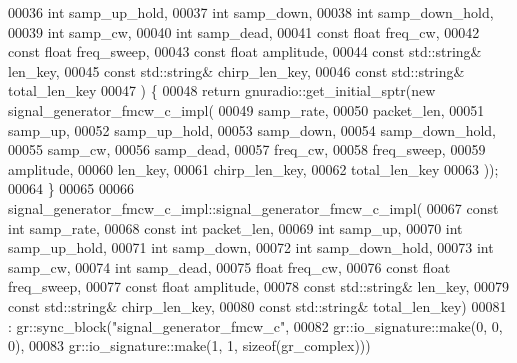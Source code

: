 \begin{DoxyCode}
00036             \textcolor{keywordtype}{int} samp\_up\_hold,
00037             \textcolor{keywordtype}{int} samp_down,
00038             \textcolor{keywordtype}{int} samp\_down\_hold,
00039             \textcolor{keywordtype}{int} samp_cw,
00040             \textcolor{keywordtype}{int} samp\_dead,
00041             \textcolor{keyword}{const} \textcolor{keywordtype}{float} freq_cw,
00042             \textcolor{keyword}{const} \textcolor{keywordtype}{float} freq\_sweep,
00043             \textcolor{keyword}{const} \textcolor{keywordtype}{float} amplitude,
00044             \textcolor{keyword}{const} std::string& len\_key,
00045             \textcolor{keyword}{const} std::string& chirp\_len\_key,
00046             \textcolor{keyword}{const} std::string& total\_len\_key
00047     ) \{
00048       \textcolor{keywordflow}{return} gnuradio::get\_initial\_sptr(\textcolor{keyword}{new} signal_generator_fmcw_c_impl(
00049           samp\_rate,
00050           packet\_len,
00051           samp\_up,
00052           samp\_up\_hold,
00053           samp\_down,
00054           samp\_down\_hold,
00055           samp\_cw,
00056           samp\_dead,
00057           freq\_cw,
00058           freq\_sweep,
00059           amplitude,
00060           len\_key,
00061           chirp\_len\_key,
00062           total\_len\_key
00063       ));
00064     \}
00065 
00066     signal_generator_fmcw_c_impl::signal_generator_fmcw_c_impl(
00067             \textcolor{keyword}{const} \textcolor{keywordtype}{int} samp_rate,
00068             \textcolor{keyword}{const} \textcolor{keywordtype}{int} packet\_len,
00069             \textcolor{keywordtype}{int} samp_up,
00070             \textcolor{keywordtype}{int} samp\_up\_hold,
00071             \textcolor{keywordtype}{int} samp_down,
00072             \textcolor{keywordtype}{int} samp\_down\_hold,
00073             \textcolor{keywordtype}{int} samp_cw,
00074             \textcolor{keywordtype}{int} samp\_dead,
00075             \textcolor{keywordtype}{float} freq_cw,
00076             \textcolor{keyword}{const} \textcolor{keywordtype}{float} freq\_sweep,
00077             \textcolor{keyword}{const} \textcolor{keywordtype}{float} amplitude,
00078             \textcolor{keyword}{const} std::string& len\_key,
00079             \textcolor{keyword}{const} std::string& chirp\_len\_key,
00080             \textcolor{keyword}{const} std::string& total\_len\_key)
00081       : gr::sync\_block(\textcolor{stringliteral}{"signal\_generator\_fmcw\_c"},
00082               gr::io\_signature::make(0, 0, 0),
00083               gr::io\_signature::make(1, 1, sizeof(gr\_complex)))

\end{DoxyCode}
